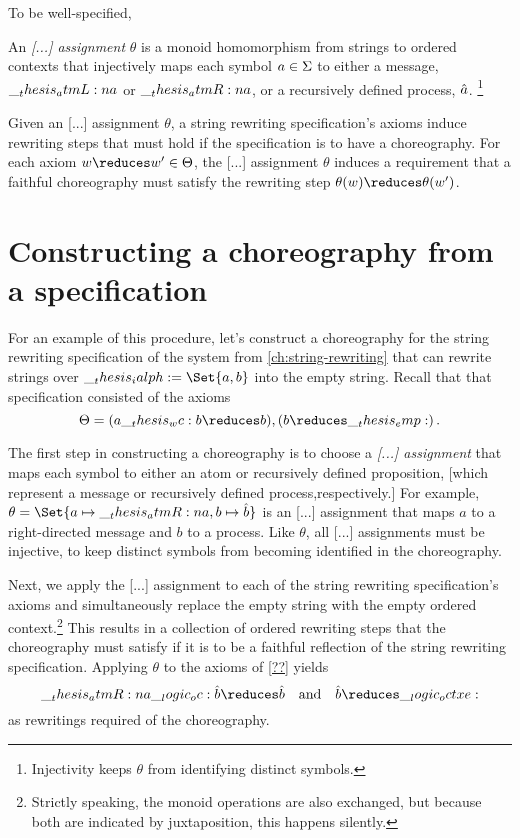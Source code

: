 To be well-specified, 

An \emph{[...] assignment} $\theta$ is a monoid homomorphism from strings to ordered contexts that injectively maps each symbol $a \in \Sigma$ to either a message, $\__thesis_atmL:n {a}$ or $\__thesis_atmR:n {a}$, or a recursively defined process, $\hat{a}$.%
\footnote{Injectivity keeps $\theta$ from identifying distinct symbols.}

Given an [...] assignment $\theta$, a string rewriting specification's axioms induce rewriting steps that must hold if the specification is to have a choreography.
For each axiom $w \reduces w' \in \srsig$, the [...] assignment $\theta$ induces a requirement that a faithful choreography must satisfy the rewriting step $\theta(w) \reduces \theta(w')$.

\section{Constructing a choreography from a specification}

For an example of this procedure, let's construct a choreography for the string rewriting specification of the system from \cref{ch:string-rewriting} that can rewrite strings over $\ialph = \Set{a,b}$ into the empty string.
Recall that that specification consisted of the axioms
\begin{equation*}
  \srsig = (a \wc b \reduces b) , (b \reduces \emp)
  \,.
\end{equation*}


The first step in constructing a choreography is to choose a \emph{[...] assignment} that maps each symbol to either an atom or recursively defined proposition, [which represent a message or recursively defined process,respectively.]
For example, $\theta = \Set{a \mapsto \atmR{a} , b \mapsto \defp{b}}$ is an [...] assignment that maps $a$ to a right-directed message and $b$ to a process.
Like $\theta$, all [...] assignments must be injective, to keep distinct symbols from becoming identified in the choreography.

Next, we apply the [...] assignment to each of the string rewriting specification's axioms and simultaneously replace the empty string with the empty ordered context.\footnote{Strictly speaking, the monoid operations are also exchanged, but because both are indicated by juxtaposition, this happens silently.}
This results in a collection of ordered rewriting steps that the choreography must satisfy if it is to be a faithful reflection of the string rewriting specification.
Applying $\theta$ to the axioms of \cref{??} yields 
\begin{equation*}
  \atmR{a} \oc \defp{b} \reduces \defp{b}
  \quad\text{and}\quad
  \defp{b} \reduces \octxe
\end{equation*}
as rewritings required of the choreography.

